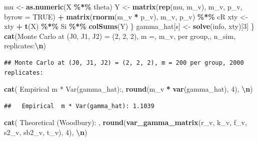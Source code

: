 \documentclass[
  11pt,
]{article}
\newenvironment{Shaded}{\begin{snugshade}}{\end{snugshade}}
\newcommand{\AttributeTok}[1]{\textcolor[rgb]{0.13,0.29,0.53}{#1}}
\newcommand{\ConstantTok}[1]{\textcolor[rgb]{0.56,0.35,0.01}{#1}}
\newcommand{\DecValTok}[1]{\textcolor[rgb]{0.00,0.00,0.81}{#1}}
\newcommand{\FunctionTok}[1]{\textcolor[rgb]{0.13,0.29,0.53}{\textbf{#1}}}
\newcommand{\NormalTok}[1]{#1}
\newcommand{\OtherTok}[1]{\textcolor[rgb]{0.56,0.35,0.01}{#1}}
\newcommand{\SpecialCharTok}[1]{\textcolor[rgb]{0.81,0.36,0.00}{\textbf{#1}}}
\newcommand{\StringTok}[1]{\textcolor[rgb]{0.31,0.60,0.02}{#1}}
\begin{document}
\begin{Shaded}
\begin{Highlighting}[]
\NormalTok{    mu }\OtherTok{\textless{}{-}} \FunctionTok{as.numeric}\NormalTok{(X }\SpecialCharTok{\%*\%}\NormalTok{ theta)}
\NormalTok{    Y }\OtherTok{\textless{}{-}} \FunctionTok{matrix}\NormalTok{(}\FunctionTok{rep}\NormalTok{(mu, m\_v), m\_v, p\_v, }\AttributeTok{byrow =} \ConstantTok{TRUE}\NormalTok{) }\SpecialCharTok{+}
      \FunctionTok{matrix}\NormalTok{(}\FunctionTok{rnorm}\NormalTok{(m\_v }\SpecialCharTok{*}\NormalTok{ p\_v), m\_v, p\_v) }\SpecialCharTok{\%*\%}\NormalTok{ cR}
\NormalTok{    xty }\OtherTok{\textless{}{-}}\NormalTok{ xty }\SpecialCharTok{+} \FunctionTok{t}\NormalTok{(X) }\SpecialCharTok{\%*\%}\NormalTok{ Si }\SpecialCharTok{\%*\%} \FunctionTok{colSums}\NormalTok{(Y)}
\NormalTok{  \}}
\NormalTok{  gamma\_hat[s] }\OtherTok{\textless{}{-}} \FunctionTok{solve}\NormalTok{(info, xty)[}\DecValTok{3}\NormalTok{]}
\NormalTok{\}}
\FunctionTok{cat}\NormalTok{(}\StringTok{\textquotesingle{}Monte Carlo at (J0, J1, J2) = (2, 2, 2), m =\textquotesingle{}}\NormalTok{, m\_v,}
    \StringTok{\textquotesingle{}per group,\textquotesingle{}}\NormalTok{, n\_sim, }\StringTok{\textquotesingle{}replicates:}\SpecialCharTok{\textbackslash{}n}\StringTok{\textquotesingle{}}\NormalTok{)}
\end{Highlighting}
\end{Shaded}

\begin{verbatim}
## Monte Carlo at (J0, J1, J2) = (2, 2, 2), m = 200 per group, 2000 replicates:
\end{verbatim}

\begin{Shaded}
\begin{Highlighting}[]
\FunctionTok{cat}\NormalTok{(}\StringTok{\textquotesingle{}  Empirical  m * Var(gamma\_hat):\textquotesingle{}}\NormalTok{,}
    \FunctionTok{round}\NormalTok{(m\_v }\SpecialCharTok{*} \FunctionTok{var}\NormalTok{(gamma\_hat), }\DecValTok{4}\NormalTok{), }\StringTok{\textquotesingle{}}\SpecialCharTok{\textbackslash{}n}\StringTok{\textquotesingle{}}\NormalTok{)}
\end{Highlighting}
\end{Shaded}

\begin{verbatim}
##   Empirical  m * Var(gamma_hat): 1.1039
\end{verbatim}

\begin{Shaded}
\begin{Highlighting}[]
\FunctionTok{cat}\NormalTok{(}\StringTok{\textquotesingle{}  Theoretical (Woodbury):       \textquotesingle{}}\NormalTok{,}
    \FunctionTok{round}\NormalTok{(}\FunctionTok{var\_gamma\_matrix}\NormalTok{(r\_v, k\_v, f\_v, s2\_v, sb2\_v,}
\NormalTok{                           t\_v), }\DecValTok{4}\NormalTok{), }\StringTok{\textquotesingle{}}\SpecialCharTok{\textbackslash{}n}\StringTok{\textquotesingle{}}\NormalTok{)}
\end{Highlighting}
\end{Shaded}
\end{document}
